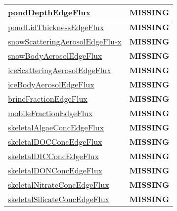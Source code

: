 {\begin{center}
\begin{longtable}{| p{2.0in} | p{4.0in} |}
    \hline
    \hyperref[subsec:var_sec_tracer_edge_fluxes_pondDepthEdgeFlux]{pondDepthEdgeFlux} & {\bf \color{red} MISSING} \\
    \hline
    \hyperref[subsec:var_sec_tracer_edge_fluxes_pondLidThicknessEdgeFlux]{pondLidThicknessEdgeFlux} & {\bf \color{red} MISSING} \\
    \hline
    \hyperref[subsec:var_sec_tracer_edge_fluxes_snowScatteringAerosolEdgeFlux]{snowScatteringAerosolEdgeFlu-}\hyperref[subsec:var_sec_tracer_edge_fluxes_snowScatteringAerosolEdgeFlux]{x  }& {\bf \color{red} MISSING} \\
    \hline
    \hyperref[subsec:var_sec_tracer_edge_fluxes_snowBodyAerosolEdgeFlux]{snowBodyAerosolEdgeFlux} & {\bf \color{red} MISSING} \\
    \hline
    \hyperref[subsec:var_sec_tracer_edge_fluxes_iceScatteringAerosolEdgeFlux]{iceScatteringAerosolEdgeFlux} & {\bf \color{red} MISSING} \\
    \hline
    \hyperref[subsec:var_sec_tracer_edge_fluxes_iceBodyAerosolEdgeFlux]{iceBodyAerosolEdgeFlux} & {\bf \color{red} MISSING} \\
    \hline
    \hyperref[subsec:var_sec_tracer_edge_fluxes_brineFractionEdgeFlux]{brineFractionEdgeFlux} & {\bf \color{red} MISSING} \\
    \hline
    \hyperref[subsec:var_sec_tracer_edge_fluxes_mobileFractionEdgeFlux]{mobileFractionEdgeFlux} & {\bf \color{red} MISSING} \\
    \hline
    \hyperref[subsec:var_sec_tracer_edge_fluxes_skeletalAlgaeConcEdgeFlux]{skeletalAlgaeConcEdgeFlux} & {\bf \color{red} MISSING} \\
    \hline
    \hyperref[subsec:var_sec_tracer_edge_fluxes_skeletalDOCConcEdgeFlux]{skeletalDOCConcEdgeFlux} & {\bf \color{red} MISSING} \\
    \hline
    \hyperref[subsec:var_sec_tracer_edge_fluxes_skeletalDICConcEdgeFlux]{skeletalDICConcEdgeFlux} & {\bf \color{red} MISSING} \\
    \hline
    \hyperref[subsec:var_sec_tracer_edge_fluxes_skeletalDONConcEdgeFlux]{skeletalDONConcEdgeFlux} & {\bf \color{red} MISSING} \\
    \hline
    \hyperref[subsec:var_sec_tracer_edge_fluxes_skeletalNitrateConcEdgeFlux]{skeletalNitrateConcEdgeFlux} & {\bf \color{red} MISSING} \\
    \hline
    \hyperref[subsec:var_sec_tracer_edge_fluxes_skeletalSilicateConcEdgeFlux]{skeletalSilicateConcEdgeFlux} & {\bf \color{red} MISSING} \\

\end{longtable}
\end{center}}
